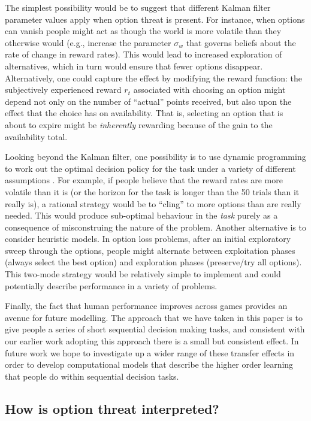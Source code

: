 \documentclass[a4paper,doc,natbib]{apa6}
\begin{document}
The simplest possibility would be to suggest that different Kalman filter parameter values apply when option threat is present. For instance, when options can vanish people might act as though the world is more volatile than they otherwise would (e.g., increase the parameter $\sigma_w$ that governs beliefs about the rate of change in reward rates). This would lead to increased exploration of alternatives, which in turn would ensure that fewer options disappear. Alternatively, one could capture the effect by modifying the reward function: the subjectively experienced reward $r_t$ associated with choosing an option might depend not only on the number of ``actual'' points received, but also upon the effect that the choice has on availability. That is, selecting an option that is about to expire might be {\it inherently} rewarding because of the gain to the availability total.

Looking beyond the Kalman filter, one possibility is to use dynamic programming to work out the optimal decision policy for the task under a variety of different assumptions \citep[e.g.,][]{littman2009tutorial}. For example, if people believe that the reward rates are more volatile than it is (or the horizon for the task is longer than the 50 trials than it really is), a rational strategy would be to ``cling'' to more options than are really needed. This would produce sub-optimal behaviour in the {\it task} purely as a consequence of misconstruing the nature of the problem. Another alternative is to consider heuristic models. In option loss problems, after an initial exploratory sweep through the options, people might alternate between exploitation phases (always select the best option) and  exploration phases (preserve/try all options). This two-mode strategy would be relatively simple to implement and could potentially describe performance in a variety of problems.

Finally, the fact that human performance improves across games provides an avenue for future modelling. The approach that we have taken in this paper is to give people a series of short sequential decision making tasks, and consistent with our earlier work adopting this approach \citep{navarro2016learning,HotalingNN_skilledcogsci} there is a small but consistent effect. In future work we hope to investigate up a wider range of these transfer effects in order to develop computational models that describe the higher order learning that people do within sequential decision tasks.

\subsection{How is option threat interpreted?}
\end{document}
